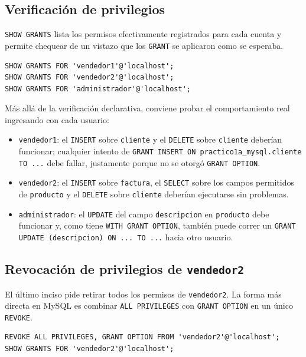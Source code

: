 \documentclass[11pt,a4paper]{article}
\begin{document}
\subsection{Verificación de privilegios}

\texttt{SHOW GRANTS} lista los permisos efectivamente registrados para cada cuenta y permite chequear de un vistazo que los \texttt{GRANT} se aplicaron como se esperaba.

\begin{lstlisting}
SHOW GRANTS FOR 'vendedor1'@'localhost';
SHOW GRANTS FOR 'vendedor2'@'localhost';
SHOW GRANTS FOR 'administrador'@'localhost';
\end{lstlisting}

Más allá de la verificación declarativa, conviene probar el comportamiento real ingresando con cada usuario:

\begin{itemize}
    \item \texttt{vendedor1}: el \texttt{INSERT} sobre \texttt{cliente} y el \texttt{DELETE} sobre \texttt{cliente} deberían funcionar; cualquier intento de \texttt{GRANT INSERT ON practico1a\_mysql.cliente TO ...} debe fallar, justamente porque no se otorgó \texttt{GRANT OPTION}.
    \item \texttt{vendedor2}: el \texttt{INSERT} sobre \texttt{factura}, el \texttt{SELECT} sobre los campos permitidos de \texttt{producto} y el \texttt{DELETE} sobre \texttt{cliente} deberían ejecutarse sin problemas.
    \item \texttt{administrador}: el \texttt{UPDATE} del campo \texttt{descripcion} en \texttt{producto} debe funcionar y, como tiene \texttt{WITH GRANT OPTION}, también puede correr un \texttt{GRANT UPDATE (descripcion) ON ... TO ...} hacia otro usuario.
\end{itemize}

\subsection{Revocación de privilegios de \texttt{vendedor2}}

El último inciso pide retirar todos los permisos de \texttt{vendedor2}. La forma más directa en MySQL es combinar \texttt{ALL PRIVILEGES} con \texttt{GRANT OPTION} en un único \texttt{REVOKE}.

\begin{lstlisting}
REVOKE ALL PRIVILEGES, GRANT OPTION FROM 'vendedor2'@'localhost';
SHOW GRANTS FOR 'vendedor2'@'localhost';
\end{lstlisting}
\end{document}
